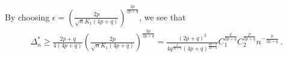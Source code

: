 % 
% 
% 

 
By choosing $\epsilon = \left(\frac{2p}{\sqrt{n} K_1(4p+q)} \right)^{\frac{2p}{2p+q}}$, we see that 
\begin{align}
\Delta_n^* \ge \frac{2p+q}{4(4p+q)}\left(\frac{2p}{\sqrt{n} K_1(4p+q)} \right)^{\frac{2p}{2p+q}} = \frac{\left(2p+q\right)^2}{4q^{\frac{q}{2p+q}}\left(4p+q\right)^{\frac{4p+q}{2p+q}}}C_1^{\frac{q}{2p+q}} C_2^{\frac{p}{2p+q}}  n^{-\tfrac{p}{2p+q}} \,.
\label{eq:lb-pq}
\end{align}

